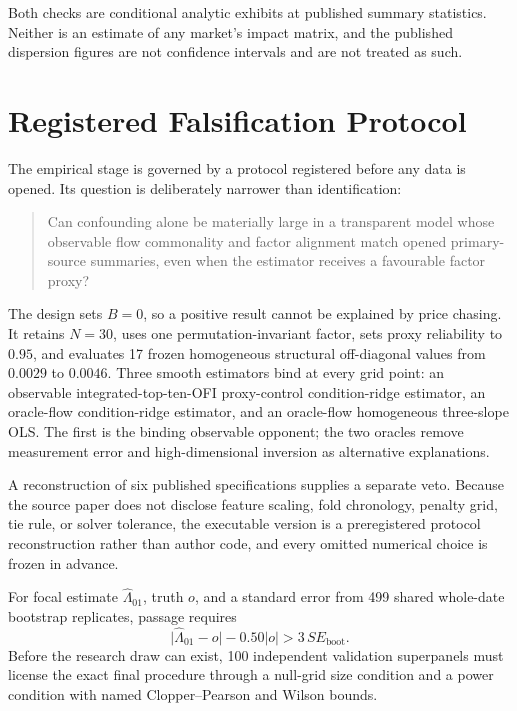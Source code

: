 \documentclass[10pt,twocolumn]{article}
\theoremstyle{remark}
\begin{document}
Both checks are conditional analytic exhibits at published summary statistics.
Neither is an estimate of any market's impact matrix, and the published
dispersion figures are not confidence intervals and are not treated as such.

\section{Registered Falsification Protocol}
\label{sec:premise}

The empirical stage is governed by a protocol registered before any data is
opened. Its question is deliberately narrower than identification:

\begin{quote}
Can confounding alone be materially large in a transparent model whose
observable flow commonality and factor alignment match opened primary-source
summaries, even when the estimator receives a favourable factor proxy?
\end{quote}

The design sets $B=0$, so a positive result cannot be explained by price
chasing. It retains $N=30$, uses one permutation-invariant factor, sets proxy
reliability to $0.95$, and evaluates 17 frozen homogeneous structural
off-diagonal values from $0.0029$ to $0.0046$. Three smooth estimators bind at
every grid point: an observable integrated-top-ten-OFI proxy-control
condition-ridge estimator, an oracle-flow condition-ridge estimator, and an
oracle-flow homogeneous three-slope OLS. The first is the binding observable
opponent; the two oracles remove measurement error and high-dimensional
inversion as alternative explanations.

A reconstruction of six published specifications supplies a separate veto.
Because the source paper does not disclose feature scaling, fold chronology,
penalty grid, tie rule, or solver tolerance, the executable version is a
preregistered protocol reconstruction rather than author code, and every
omitted numerical choice is frozen in advance.

For focal estimate $\widehat\Lambda_{01}$, truth $o$, and a standard error from
499 shared whole-date bootstrap replicates, passage requires
\begin{equation}
\bigl|\widehat\Lambda_{01}-o\bigr|-0.50|o|>3\,SE_{\mathrm{boot}}.
\label{eq:gate}
\end{equation}
Before the research draw can exist, 100 independent validation superpanels must
license the exact final procedure through a null-grid size condition and a
power condition with named Clopper--Pearson and Wilson bounds.
\end{document}

